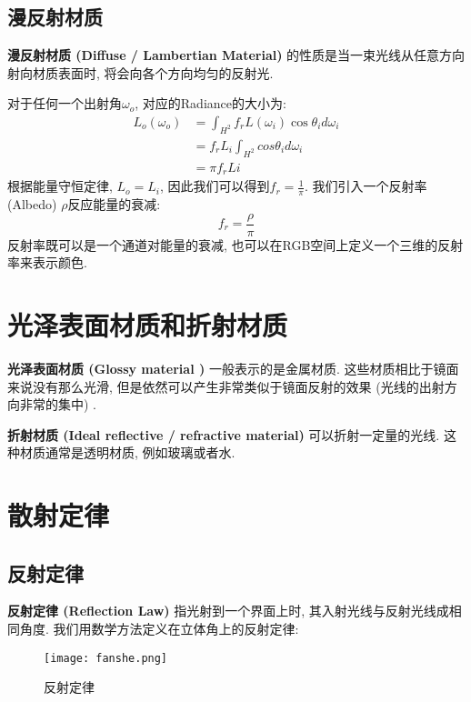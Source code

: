 \subsection{漫反射材质}
\textbf{漫反射材质 (Diffuse / Lambertian Material) }的性质是当一束光线从任意方向射向材质表面时, 将会向各个方向均匀的反射光. 

对于任何一个出射角$\omega_o$, 对应的Radiance的大小为: 
\begin{equation}
	\begin{split}
		L_o(\omega_o)&=\int_{H^2}f_rL(\omega_i)\cos\theta_id\omega_i\\
		&=f_rL_i\int_{H^2}cos\theta_id\omega_i\\
		&=\pi f_r Li
	\end{split}
\end{equation}
根据能量守恒定律, $L_o=L_i$, 因此我们可以得到$f_r=\frac{1}{\pi}$. 我们引入一个反射率 (Albedo) $\rho$反应能量的衰减: 
\begin{equation}
	f_r=\frac{\rho}{\pi}
\end{equation}
反射率既可以是一个通道对能量的衰减, 也可以在RGB空间上定义一个三维的反射率来表示颜色. 

\section{光泽表面材质和折射材质}

\textbf{光泽表面材质 (Glossy material ) }一般表示的是金属材质. 这些材质相比于镜面来说没有那么光滑, 但是依然可以产生非常类似于镜面反射的效果 (光线的出射方向非常的集中) . 

\textbf{折射材质 (Ideal reflective / refractive material) } 可以折射一定量的光线. 这种材质通常是透明材质, 例如玻璃或者水. 

\section{散射定律}

\subsection{反射定律}

\textbf{反射定律 (Reflection Law) }指光射到一个界面上时, 其入射光线与反射光线成相同角度. 我们用数学方法定义在立体角上的反射定律: 

\begin{figure}[H]
	\centering
	\texttt{[image: fanshe.png]}
	\caption{反射定律}
	\label{fig:fanshed}
\end{figure}

